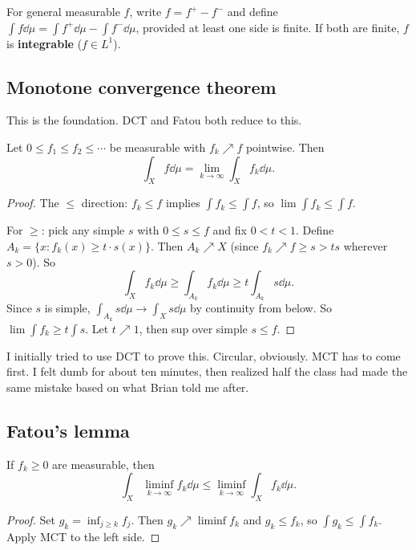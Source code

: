 For general measurable $f$, write $f = f^+ - f^-$ and define
$\int f \dd\mu = \int f^+ \dd\mu - \int f^- \dd\mu$, provided at least one
side is finite. If both are finite, $f$ is \textbf{integrable}
($f \in L^1$).


\subsection{Monotone convergence theorem}\label{subsec:mct}

This is the foundation. DCT and Fatou both reduce to this.

\begin{theorem}\label{thm:mct}
Let $0 \le f_1 \le f_2 \le \cdots$ be measurable with
$f_k \nearrow f$ pointwise. Then
\[
  \int_X f \dd\mu = \lim_{k \to \infty} \int_X f_k \dd\mu.
\]
\end{theorem}

\begin{proof}
The $\le$ direction: $f_k \le f$ implies $\int f_k \le \int f$, so
$\lim \int f_k \le \int f$.

For $\ge$: pick any simple $s$ with $0 \le s \le f$ and fix $0 < t < 1$.
Define $A_k = \{x : f_k(x) \ge t \cdot s(x)\}$. Then $A_k \nearrow X$
(since $f_k \nearrow f \ge s > ts$ wherever $s > 0$). So
\[
  \int_X f_k \dd\mu \ge \int_{A_k} f_k \dd\mu
    \ge t \int_{A_k} s \dd\mu.
\]
Since $s$ is simple, $\int_{A_k} s \dd\mu \to \int_X s \dd\mu$ by
continuity from below. So $\lim \int f_k \ge t \int s$. Let
$t \nearrow 1$, then sup over simple $s \le f$. \qedhere
\end{proof}

I initially tried to use DCT to prove this. Circular, obviously. MCT has to come
first. I felt dumb for about ten minutes, then realized half the class had made the same mistake based on what Brian told me after.


\subsection{Fatou's lemma}\label{subsec:fatou}

\begin{lemma}[Fatou]\label{lem:fatou}
If $f_k \ge 0$ are measurable, then
\[
  \int_X \liminf_{k \to \infty} f_k \dd\mu
    \le \liminf_{k \to \infty} \int_X f_k \dd\mu.
\]
\end{lemma}

\begin{proof}
Set $g_k = \inf_{j \ge k} f_j$. Then $g_k \nearrow \liminf f_k$
and $g_k \le f_k$, so $\int g_k \le \int f_k$. Apply MCT to the left
side. \qedhere
\end{proof}

